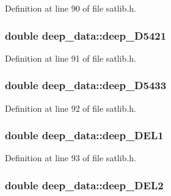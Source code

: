 Definition at line 90 of file satlib.\-h.

\hypertarget{structdeep__data_a7f1d7113215d1faeeafcd818832f4da4}{
\subsubsection[{deep\-\_\-\-D5421}]{\setlength{\rightskip}{0pt plus 5cm}double deep\-\_\-data\-::deep\-\_\-\-D5421}}\label{structdeep__data_a7f1d7113215d1faeeafcd818832f4da4}


Definition at line 91 of file satlib.\-h.

\hypertarget{structdeep__data_ac7705b43b143e8a75b7a31f044000b19}{
\subsubsection[{deep\-\_\-\-D5433}]{\setlength{\rightskip}{0pt plus 5cm}double deep\-\_\-data\-::deep\-\_\-\-D5433}}\label{structdeep__data_ac7705b43b143e8a75b7a31f044000b19}


Definition at line 92 of file satlib.\-h.

\hypertarget{structdeep__data_ae9e2a8ed7f2195320d1cd0fdb9b89dc4}{
\subsubsection[{deep\-\_\-\-D\-E\-L1}]{\setlength{\rightskip}{0pt plus 5cm}double deep\-\_\-data\-::deep\-\_\-\-D\-E\-L1}}\label{structdeep__data_ae9e2a8ed7f2195320d1cd0fdb9b89dc4}


Definition at line 93 of file satlib.\-h.

\hypertarget{structdeep__data_aa6140563b789a280396850b260e6e33f}{
\subsubsection[{deep\-\_\-\-D\-E\-L2}]{\setlength{\rightskip}{0pt plus 5cm}double deep\-\_\-data\-::deep\-\_\-\-D\-E\-L2}}\label{structdeep__data_aa6140563b789a280396850b260e6e33f}


